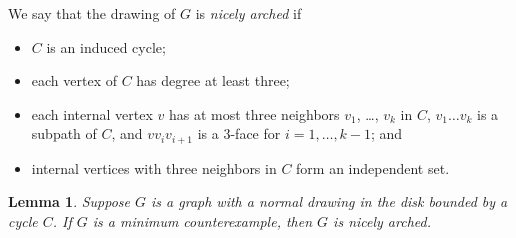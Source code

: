 \documentclass[12pt,twoside,openright,a4paper]{book}
\newtheorem{lemma}[theorem]{Lemma}
\begin{document}
We say that the drawing of $G$ is \emph{nicely arched} if
\begin{itemize}
\item $C$ is an induced cycle;
\item each vertex of $C$ has degree at least three;
\item each internal vertex $v$ has at most three neighbors $v_1$, \ldots, $v_k$ in $C$,
$v_1\ldots v_k$ is a subpath of $C$, and $vv_iv_{i+1}$ is a $3$-face for $i=1,\ldots,k-1$; and
\item internal vertices with three neighbors in $C$ form an independent set.
\end{itemize}

\begin{lemma}\label{lemma:arch}
Suppose $G$ is a graph with a normal drawing in the disk bounded by a cycle $C$.
If $G$ is a minimum counterexample, then $G$ is nicely arched.
\end{lemma}
\end{document}
